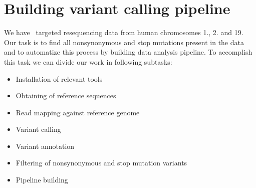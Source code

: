 \section{Building variant calling pipeline}
We have \IonTorrent~targeted resequencing data from human chromosomes 1., 2. and 19. 
Our task is to find all nonsynonymous and stop mutations present in the data
and to automatize this process by building data analysis pipeline.
To accomplish this task we can divide our work in following subtasks:
\begin{itemize}
  \item Installation of relevant tools
  \item Obtaining of reference sequences
  \item Read mapping against reference genome
  \item Variant calling
  \item Variant annotation
  \item Filtering of nonsynonymous and stop mutation variants
  \item Pipeline building
\end{itemize}




